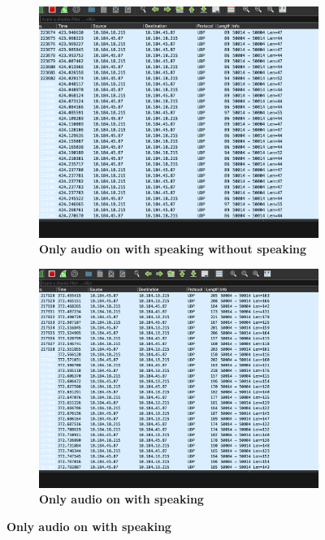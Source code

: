 \documentclass{article}
\begin{document}
\begin{figure}[H]
    \centering
    \begin{subfigure}[b]{0.455\textwidth}
        \centering
        \includegraphics[width=\textwidth]{only_audio_no_speaking.png}
        \caption*{\textbf{Only audio on with speaking without speaking}}
    \end{subfigure}
    \hfill
    \begin{subfigure}[b]{0.48\textwidth}
        \centering
        \includegraphics[width=\textwidth]{only_audio_speaking.png}
        \caption*{\textbf{Only audio on with speaking}}
    \end{subfigure}
\end{figure}
\end{document}
